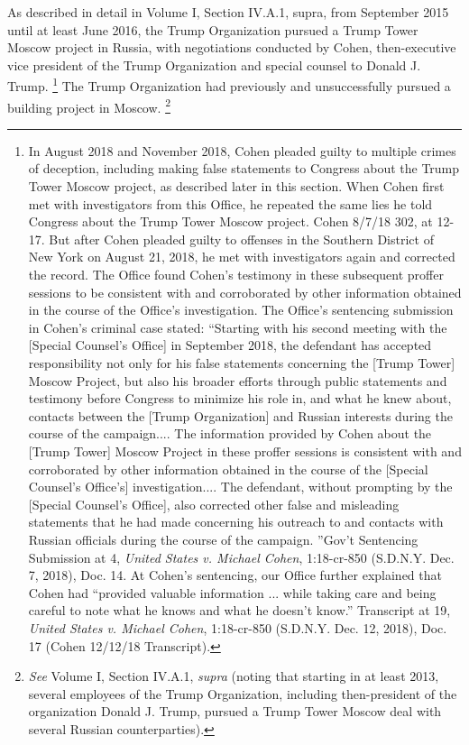 As described in detail in Volume I, Section IV.A.1, supra, from September 2015 until at least June 2016, the Trump Organization pursued a Trump Tower Moscow project in Russia, with negotiations conducted by Cohen, then-executive vice president of the Trump Organization and special counsel to Donald J. Trump.%
\footnote{In August 2018 and November 2018, Cohen pleaded guilty to multiple crimes of deception, including making false statements to Congress about the Trump Tower Moscow project, as described later in this section.
When Cohen first met with investigators from this Office, he repeated the same lies he told Congress about the Trump Tower Moscow project.
Cohen 8/7/18 302, at 12-17.
But after Cohen pleaded guilty to offenses in the Southern District of New York on August 21, 2018, he met with investigators again and corrected the record.
The Office found Cohen’s testimony in these subsequent proffer sessions to be consistent with and corroborated by other information obtained in the course of the Office’s investigation.
The Office’s sentencing submission in Cohen’s criminal case stated: “Starting with his second meeting with the [Special Counsel’s Office] in September 2018, the defendant has accepted responsibility not only for his false statements concerning the [Trump Tower] Moscow Project, but also his broader efforts through public statements and testimony before Congress to minimize his role in, and what he knew about, contacts between the [Trump Organization] and Russian interests during the course of the campaign....
The information provided by Cohen about the [Trump Tower] Moscow Project in these proffer sessions is consistent with and corroborated by other information obtained in the course of the [Special Counsel’s Office’s] investigation....
The defendant, without prompting by the [Special Counsel’s Office], also corrected other false and misleading statements that he had made concerning his outreach to and contacts with Russian officials during the course of the campaign.
”Gov’t Sentencing Submission at 4, \textit{United States v. Michael Cohen}, 1:18-cr-850 (S.D.N.Y. Dec. 7, 2018), Doc. 14.
At Cohen’s sentencing, our Office further explained that Cohen had “provided valuable information ... while taking care and being careful to note what he knows and what he doesn’t know.”
Transcript at 19, \textit{United States v. Michael Cohen}, 1:18-cr-850 (S.D.N.Y. Dec. 12, 2018), Doc. 17 (Cohen 12/12/18 Transcript).}
The Trump Organization had previously and unsuccessfully pursued a building project in Moscow.%
\footnote{\textit{See} Volume I, Section IV.A.1, \textit{supra} (noting that starting in at least 2013, several employees of the Trump Organization, including then-president of the organization Donald J. Trump, pursued a Trump Tower Moscow deal with several Russian counterparties).}
